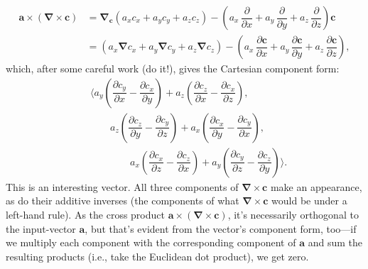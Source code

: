 \documentclass[12pt]{article}
\renewcommand{\vv}[1]{\mathbf{#1}}
\newcommand{\del}{\boldsymbol{\nabla}}
\begin{document}
\begin{equation*}
\begin{split}
\vv a \times (\del \times \vv c) &= \del_{\vv c} \left( a_x c_x + a_y c_y + a_z c_z \right) - \left( a_x \, \dfrac{\partial}{\partial x} + a_y \, \dfrac{\partial}{\partial y} + a_z \, \dfrac{\partial}{\partial z} \right) \vv c \\[3pt]
&= \left( a_x \del c_x + a_y \del c_y + a_z \del c_z \right) - \left( a_x \, \dfrac{\partial \vv c}{\partial x} + a_y \, \dfrac{\partial \vv c}{\partial y} + a_z \, \dfrac{\partial \vv c}{\partial z} \right) ,
\end{split}
\end{equation*}
which, after some careful work (do it!), gives the Cartesian component form:
\begin{equation*}
\begin{split}
& \Bigg \langle a_y \left( \dfrac{\partial c_y}{\partial x} - \dfrac{\partial c_x}{\partial y} \right) + a_z \left( \dfrac{\partial c_z}{\partial x} - \dfrac{\partial c_x}{\partial z} \right) , \\
&\qquad  a_z \left( \dfrac{\partial c_z}{\partial y} - \dfrac{\partial c_y}{\partial z} \right) + a_x \left( \dfrac{\partial c_x}{\partial y} - \dfrac{\partial c_y}{\partial x} \right) , \\
&\qquad \qquad  a_x \left( \dfrac{\partial c_x}{\partial z} - \dfrac{\partial c_z}{\partial x} \right) + a_y \left( \dfrac{\partial c_y}{\partial z} - \dfrac{\partial c_z}{\partial y} \right) \Bigg \rangle .
\end{split}
\end{equation*}
This is an interesting vector. All three components of $\del \times \vv c$ make an appearance, as do their additive inverses (the components of what $\del \times \vv c$ would be under a left-hand rule). As the cross product $\vv a \times (\del \times \vv c)$, it's necessarily orthogonal to the input-vector $\vv a$, but that's evident from the vector's component form, too---if we multiply each component with the corresponding component of $\vv a$ and sum the resulting products (i.e., take the Euclidean dot product), we get zero.
\end{document}
